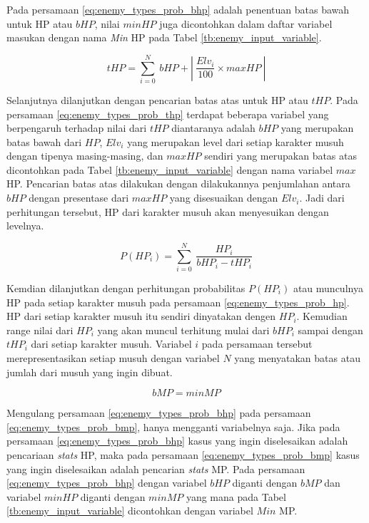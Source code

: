 Pada persamaan \ref{eq:enemy_types_prob_bhp} adalah penentuan batas bawah untuk HP atau $bHP$, nilai $minHP$ juga dicontohkan dalam daftar variabel masukan dengan nama \textit{Min} HP pada Tabel \ref{tb:enemy_input_variable}.
\vspace{1ex}

\begin{equation}\label{eq:enemy_types_prob_thp}
tHP = \sum_{i=0}^{N}\ bHP + \left |\ \frac{Elv_{i}}{100} \times maxHP\ \right |
\end{equation}

Selanjutnya dilanjutkan dengan pencarian batas atas untuk HP atau $tHP$. Pada persamaan \ref{eq:enemy_types_prob_thp} terdapat beberapa variabel yang berpengaruh terhadap nilai dari $tHP$ diantaranya adalah $bHP$ yang merupakan batas bawah dari $HP$, $Elv_{i}$ yang merupakan level dari setiap karakter musuh dengan tipenya masing-masing, dan $maxHP$ sendiri yang merupakan batas atas dicontohkan pada Tabel \ref{tb:enemy_input_variable} dengan nama variabel $max$ HP. Pencarian batas atas dilakukan dengan dilakukannya penjumlahan antara $bHP$ dengan presentase dari $maxHP$ yang disesuaikan dengan $Elv_{i}$. Jadi dari perhitungan tersebut, HP dari karakter musuh akan menyesuikan dengan levelnya. 
\vspace{1ex}

\begin{equation}\label{eq:enemy_types_prob_hp}
P(HP_{i}) = \sum_{i=0}^{N}\ \frac{HP_{i}}{bHP_{i} - tHP_{i}}
\end{equation}

Kemdian dilanjutkan dengan perhitungan probabilitas $P(HP_{i})$ atau munculnya HP pada setiap karakter musuh pada persamaan \ref{eq:enemy_types_prob_hp}. HP dari setiap karakter musuh itu sendiri dinyatakan dengen $HP_{i}$. Kemudian range nilai dari $HP_{i}$ yang akan muncul terhitung mulai dari $bHP_{i}$ sampai dengan $tHP_{i}$ dari setiap karakter musuh. Variabel $i$ pada persamaan tersebut merepresentasikan setiap musuh dengan variabel $N$ yang menyatakan batas atau jumlah dari musuh yang ingin dibuat.
\vspace{1ex}

\begin{equation}\label{eq:enemy_types_prob_bmp}
bMP = minMP
\end{equation}

Mengulang persamaan \ref{eq:enemy_types_prob_bhp} pada persamaan \ref{eq:enemy_types_prob_bmp}, hanya mengganti variabelnya saja. Jika pada persamaan \ref{eq:enemy_types_prob_bhp} kasus yang ingin diselesaikan adalah pencariaan \textit{stats} HP, maka pada persamaan \ref{eq:enemy_types_prob_bmp} kasus yang ingin diselesaikan adalah pencarian \textit{stats} MP. Pada persamaan \ref{eq:enemy_types_prob_bhp} dengan variabel $bHP$ diganti dengan $bMP$ dan variabel $minHP$ diganti dengan $minMP$ yang mana pada Tabel \ref{tb:enemy_input_variable} dicontohkan dengan variabel $Min$ MP.
\vspace{2ex}

